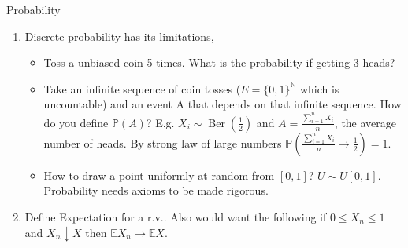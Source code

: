     Probability

    \begin{enumerate}
        \item Discrete probability has its limitations,
        \begin{itemize}
            \item Toss a unbiased coin 5 times. What is the probability if getting 3 heads?
            \item Take an infinite sequence of coin tosses ($E = \{0, 1\}^\mathbb{N}$ which is uncountable) and an event A that depends on that infinite sequence. How do you define $\mathbb{P}(A)$?
            E.g. $X_i \sim \operatorname{Ber}\left( \frac{1}{2} \right)$ and $A = \frac{\sum_{i=1}^{n} X_i}{n}$, the average number of heads.
            By strong law of large numbers $\mathbb{P}\left( \frac{\sum_{i=1}^{n} X_i}{n} \to \frac{1}{2} \right) = 1$.
            \item How to draw a point uniformly at random from $[0, 1]$? $U \sim U[0, 1]$.
            Probability needs axioms to be made rigorous.
        \end{itemize}
        \item Define Expectation for a r.v.. Also would want the following if $0 \leq X_n \leq 1$ and $X_n \downarrow X$ then $\mathbb{E} X_n \to \mathbb{E} X$.
    \end{enumerate}

    
    
    

